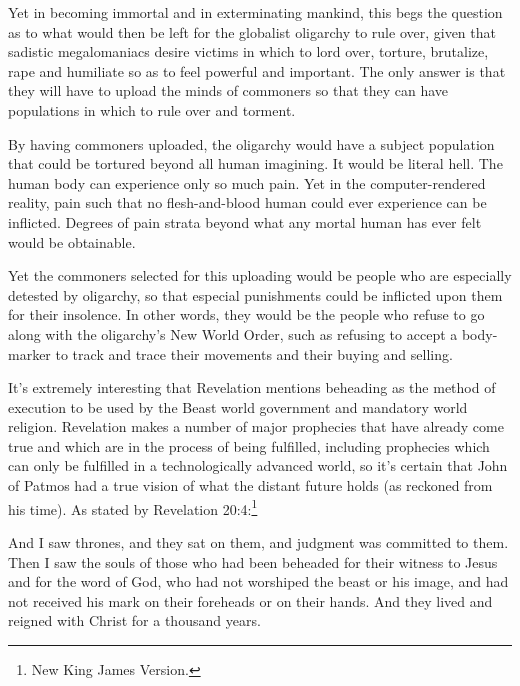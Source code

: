 \documentclass[letterpaper,12pt]{article}
\newenvironment{squote}
  {\small\quote}
  {\endquote\normalsize}
\begin{document}
Yet in becoming immortal and in exterminating mankind, this begs the question as to what would then be left for the globalist oligarchy to rule over, given that sadistic megalomaniacs desire victims in which to lord over, torture, brutalize, rape and humiliate so as to feel powerful and important. The only answer is that they will have to upload the minds of commoners so that they can have populations in which to rule over and torment.

By having commoners uploaded, the oligarchy would have a subject population that could be tortured beyond all human imagining. It would be literal hell. The human body can experience only so much pain. Yet in the computer-rendered reality, pain such that no flesh-and-blood human could ever experience can be inflicted. Degrees of pain strata beyond what any mortal human has ever felt would be obtainable.

Yet the commoners selected for this uploading would be people who are especially detested by oligarchy, so that especial punishments could be inflicted upon them for their insolence. In other words, they would be the people who refuse to go along with the oligarchy's New World Order, such as refusing to accept a body-marker to track and trace their movements and their buying and selling.

It's extremely interesting that Revelation mentions beheading as the method of execution to be used by the Beast world government and mandatory world religion. Revelation makes a number of major prophecies that have already come true and which are in the process of being fulfilled, including prophecies which can only be fulfilled in a technologically advanced world, so it's certain that John of Patmos had a true vision of what the distant future holds (as reckoned from his time). As stated by Revelation 20:4:\footnote{New King James Version.}

\begin{squote}
And I saw thrones, and they sat on them, and judgment was committed to them. Then I saw the souls of those who had been beheaded for their witness to Jesus and for the word of God, who had not worshiped the beast or his image, and had not received his mark on their foreheads or on their hands. And they lived and reigned with Christ for a thousand years.
\end{squote}
\end{document}
